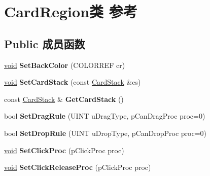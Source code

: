 \hypertarget{class_card_region}{}\section{Card\+Region类 参考}
\label{class_card_region}
\subsection*{Public 成员函数}
\begin{DoxyCompactItemize}
\item 
\mbox{\label{class_card_region_a0b6d85586477e9d9b3867e1c547eee7a}} 
\hyperlink{interfacevoid}{void} {\bfseries Set\+Back\+Color} (C\+O\+L\+O\+R\+R\+EF cr)
\item 
\mbox{\label{class_card_region_a8aa3314c820eb75a46cbfc35bc445980}} 
\hyperlink{interfacevoid}{void} {\bfseries Set\+Card\+Stack} (const \hyperlink{class_card_stack}{Card\+Stack} \&cs)
\item 
\mbox{\label{class_card_region_a91fdde6dc3590d9af1bc0bdab84b6557}} 
const \hyperlink{class_card_stack}{Card\+Stack} \& {\bfseries Get\+Card\+Stack} ()
\item 
\mbox{\label{class_card_region_a50bcb858e082ad5fb6e70b2821103215}} 
bool {\bfseries Set\+Drag\+Rule} (U\+I\+NT u\+Drag\+Type, p\+Can\+Drag\+Proc proc=0)
\item 
\mbox{\label{class_card_region_a3c53bddff5b2de41dde9d69797354d27}} 
bool {\bfseries Set\+Drop\+Rule} (U\+I\+NT u\+Drop\+Type, p\+Can\+Drop\+Proc proc=0)
\item 
\mbox{\label{class_card_region_a03685a5eb366da76b805b27e5f5ec242}} 
\hyperlink{interfacevoid}{void} {\bfseries Set\+Click\+Proc} (p\+Click\+Proc proc)
\item 
\mbox{\label{class_card_region_a3dea2b410f5a516c37f185c2c02eaba3}} 
\hyperlink{interfacevoid}{void} {\bfseries Set\+Click\+Release\+Proc} (p\+Click\+Proc proc)
\item 
\mbox{\label{class_card_region_af24bdc959c73478007c6c0ac4a0be5e1}} 

\end{DoxyCompactItemize}
